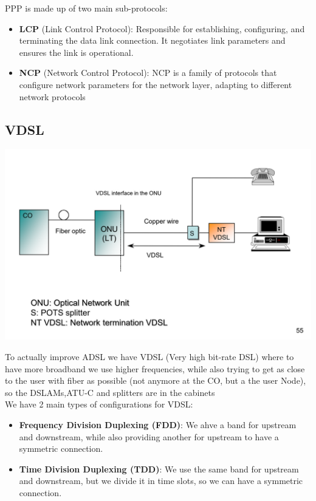\documentclass[11pt, a4paper]{article}
\begin{document}
PPP is made up of two main sub-protocols:
\begin{itemize}
    \item \textbf{LCP} (Link Control Protocol): Responsible for establishing, configuring, and terminating the data link connection. It negotiates link parameters and ensures the link is operational.
    \item \textbf{NCP} (Network Control Protocol): NCP is a family of protocols that configure network parameters for the network layer, adapting to different network protocols
\end{itemize}
\subsection{VDSL}
\begin{center}
    \includegraphics[scale=0.5]{img/AccessNetworks/VDSL/VDSL.png}
\end{center}
To actually improve ADSL we have VDSL (Very high bit-rate DSL) where to have more broadband we use higher frequencies, while also trying to get as close to the user with fiber as possible (not anymore at the CO, but a the user Node), so the DSLAMs,ATU-C and splitters are in the cabinets\\
We have 2 main types of configurations for VDSL:
\begin{itemize}
    \item \textbf{Frequency Division Duplexing (FDD)}: We ahve a band for upstream and downstream, while also providing another for upstream to have a symmetric connection.
    \item \textbf{Time Division Duplexing (TDD)}: We use the same band for upstream and downstream, but we divide it in time slots, so we can have a symmetric connection.
\end{itemize}
\end{document}
